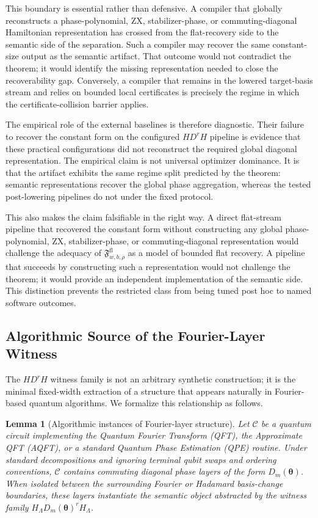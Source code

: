 \documentclass[11pt]{article}
\newtheorem{lemma}{Lemma}
\begin{document}
This boundary is essential rather than defensive. A compiler that globally
reconstructs a phase-polynomial, ZX, stabilizer-phase, or commuting-diagonal
Hamiltonian representation has crossed from the flat-recovery side to the
semantic side of the separation. Such a compiler may recover the same
constant-size output as the semantic artifact. That outcome would not
contradict the theorem; it would identify the missing representation needed to
close the recoverability gap. Conversely, a compiler that remains in the
lowered target-basis stream and relies on bounded local certificates is
precisely the regime in which the certificate-collision barrier applies.

The empirical role of the external baselines is therefore diagnostic. Their
failure to recover the constant form on the configured $H D^r H$ pipeline is
evidence that these practical configurations did not reconstruct the required
global diagonal representation. The empirical claim is not universal optimizer
dominance. It is that the artifact exhibits the same regime split predicted by
the theorem: semantic representations recover the global phase aggregation,
whereas the tested post-lowering pipelines do not under the fixed protocol.

This also makes the claim falsifiable in the right way. A direct flat-stream
pipeline that recovered the constant form without constructing any global
phase-polynomial, ZX, stabilizer-phase, or commuting-diagonal representation
would challenge the adequacy of $\mathfrak{F}^{\mathrm{fl}}_{w,b,\rho}$ as a
model of bounded flat recovery. A pipeline that succeeds by constructing such
a representation would not challenge the theorem; it would provide an
independent implementation of the semantic side. This distinction prevents the
restricted class from being tuned post hoc to named software outcomes.

\subsection{Algorithmic Source of the Fourier-Layer Witness}

The $H D^r H$ witness family is not an arbitrary synthetic construction; it is
the minimal fixed-width extraction of a structure that appears naturally in
Fourier-based quantum algorithms. We formalize this relationship as follows.

\begin{lemma}[Algorithmic instances of Fourier-layer structure]
\label{lem:algorithmic-sources}
Let $\mathcal{C}$ be a quantum circuit implementing the Quantum Fourier
Transform (QFT), the Approximate QFT (AQFT), or a standard Quantum Phase
Estimation (QPE) routine. Under standard decompositions and ignoring terminal
qubit swaps and ordering conventions, $\mathcal{C}$ contains commuting
diagonal phase layers of the form $D_m(\boldsymbol{\theta})$. When isolated
between the surrounding Fourier or Hadamard basis-change boundaries, these
layers instantiate the semantic object abstracted by the witness family
$H_{\Lambda}D_m(\boldsymbol{\theta})^rH_{\Lambda}$.
\end{lemma}
\end{document}
